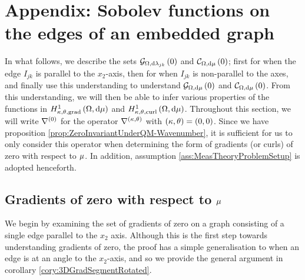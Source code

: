 \section{Appendix: Sobolev functions on the edges of an embedded graph} \label{app:3DMuAnalysis}
In what follows, we describe the sets $\mathcal{G}_{ \Omega, \mathrm{d}\lambda_{jk}}\left( 0 \right)$ and $\mathcal{C}_{ \Omega, \mathrm{d}\mu}\left( 0 \right)$; first for when the edge $I_{jk}$ is parallel to the $x_2$-axis, then for when $I_{jk}$ is non-parallel to the axes, and finally use this understanding to understand $\mathcal{G}_{ \Omega, \mathrm{d}\mu}\left( 0 \right)$ and $\mathcal{C}_{ \Omega, \mathrm{d}\mu}\left( 0 \right)$.
From this understanding, we will then be able to infer various properties of the functions in $H^1_{\kappa,\theta,\mathrm{grad}}\left( \Omega, \mathrm{d}\mu \right)$ and $H^1_{\kappa,\theta,\mathrm{curl}}\left( \Omega, \mathrm{d}\mu \right)$.
Throughout this section, we will write $\nabla^{(0)}$ for the operator $\nabla^{\left( \kappa, \theta \right)}$ with $\left( \kappa, \theta \right)=\left( 0,0 \right)$.
Since we have proposition \ref{prop:ZeroInvariantUnderQM-Wavenumber}, it is sufficient for us to only consider this operator when determining the form of gradients (or curls) of zero with respect to $\mu$.
In addition, assumption \ref{ass:MeasTheoryProblemSetup} is adopted henceforth.

\subsection{Gradients of zero with respect to $\mu$} \label{apps:3DGradientsOfZero}
We begin by examining the set of gradients of zero on a graph consisting of a single edge parallel to the $x_2$ axis.
Although this is the first step towards understanding gradients of zero, the proof has a simple generalisation to when an edge is at an angle to the $x_2$-axis, and so we provide the general argument in corollary \ref{cory:3DGradSegmentRotated}.

